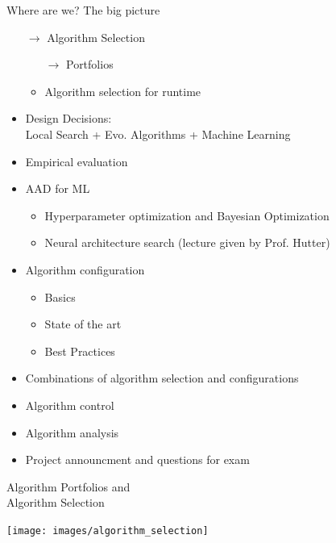 \begin{frame}[c]{Where are we? The big picture}

\begin{itemize}
\item[$\to$] Algorithm Selection
  \begin{itemize}
    \item[$\to$] Portfolios
    \item Algorithm selection for runtime
  \end{itemize}
  \item Design Decisions:\\ Local Search + Evo. Algorithms + Machine Learning 
  \item Empirical evaluation
  \item AAD for ML
  \begin{itemize}
    \item Hyperparameter optimization and Bayesian Optimization 
    \item Neural architecture search (lecture given by Prof. Hutter)
  \end{itemize}
  \item Algorithm configuration 
  \begin{itemize}
    \item Basics 
    \item State of the art 
    \item Best Practices 
  \end{itemize}
  \item Combinations of algorithm selection and configurations
  \item Algorithm control 
  \item Algorithm analysis 
  \item Project announcment and questions for exam
\end{itemize}

\end{frame}
\begin{frame}[c]{}

\centering
\huge
Algorithm Portfolios and\\ Algorithm Selection

\bigskip
\texttt{[image: images/algorithm\_selection]}

\end{frame}
